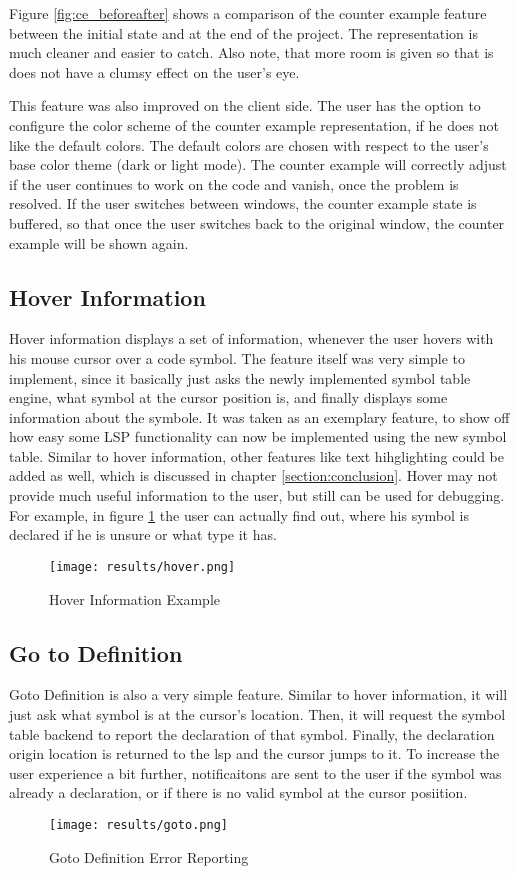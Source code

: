 Figure \ref{fig:ce_beforeafter} shows a comparison of the counter example feature between the initial state and at the end of the project.
The representation is much cleaner and easier to catch.
Also note, that more room is given so that is does not have a clumsy effect on the user's eye. 

This feature was also improved on the client side.
The user has the option to configure the color scheme of the counter example representation, if he does not like the default colors.
The default colors are chosen with respect to the user's base color theme (dark or light mode).
The counter example will correctly adjust if the user continues to work on the code and vanish, once the problem is resolved.
If the user switches between windows, the counter example state is buffered, so that once the user switches back to the original window, the counter example will be shown again.



\subsection{Hover Information}
Hover information displays a set of information, whenever the user hovers with his mouse cursor over a code symbol.
The feature itself was very simple to implement, since it basically just asks the newly implemented symbol table engine, what symbol at the cursor position is, and finally displays some information about the symbole.
It was taken as an exemplary feature, to show off how easy some LSP functionality can now be implemented using the new symbol table.
Similar to hover information, other features like text hihglighting could be added as well, which is discussed in chapter \ref{section:conclusion}.
Hover may not provide much useful information to the user, but still can be used for debugging.
For example, in figure \ref{fig:hover} the user can actually find out, where his symbol  is declared if he is unsure or what type it has.

\begin{figure}[h]
    \centering
    \texttt{[image: results/hover.png]}
    \caption{Hover Information Example}
    \label{fig:hover}
\end{figure}

\subsection{Go to Definition}
Goto Definition is also a very simple feature.
Similar to hover information, it will just ask what symbol is at the cursor's location.
Then, it will request the symbol table backend to report the declaration of that symbol.
Finally, the declaration origin location is returned to the lsp and the cursor jumps to it.
To increase the user experience a bit further, notificaitons are sent to the user if the symbol was already a declaration, or if there is no valid symbol at the cursor posiition.
\begin{figure}[h]
    \centering
    \texttt{[image: results/goto.png]}
    \caption{Goto Definition Error Reporting}
    \label{fig:goto}
\end{figure}

